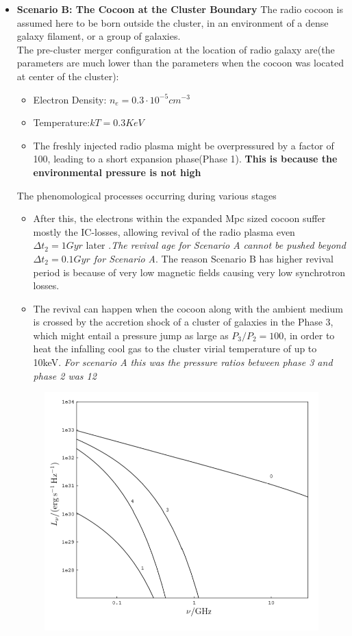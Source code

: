 \documentclass[11pt]{report}
\newcommand{\tbf}[1]{\textbf{#1}}
\newcommand{\tit}[1]{\textit{#1}}
\newcommand{\cbox}{tcolorbox}
\begin{document}
\begin{itemize}
\begin{itemize}
\begin{\cbox}
\end{\cbox}
\end{itemize}
\item \tbf{Scenario B: The Cocoon at the Cluster Boundary}
The radio cocoon is assumed here to be born outside the cluster, in an environment of a dense galaxy filament, or a group of galaxies.\\
The pre-cluster merger configuration at the location of radio galaxy are(the parameters are much lower than the parameters when the cocoon was located at center of the cluster):
\begin{itemize}
\item Electron Density: $n_e=0.3 \cdot 10^{-5}cm^{-3}$
\item Temperature:$kT=0.3KeV$
\item The freshly injected radio plasma might be overpressured by a factor of 100, leading to a short expansion phase(Phase 1). \tbf{This is because the environmental pressure is not high}
\end{itemize} 
The phenomological processes occurring during various stages
\begin{itemize}
\item After this, the electrons within the expanded Mpc sized cocoon suffer mostly the IC-losses, allowing revival of the radio plasma even $\Delta t_2 = 1Gyr$ later .\tit{The revival age for Scenario A cannot be pushed beyond $\Delta t_2=0.1 Gyr$ for Scenario A}. The reason Scenario B has higher revival period is because of very low magnetic fields causing very low synchrotron losses.
\item  The revival can happen when the cocoon along with the ambient medium is crossed by the accretion shock of a cluster of galaxies in the Phase 3, which might entail a pressure jump as large as $P_3/P_2 = 100$, in order to heat the infalling cool gas to the cluster virial temperature of up to 10keV. \tit{For scenario A this was the pressure ratios between phase 3 and phase 2 was 12}
\end{itemize} 
\begin{figure}[h!]\label{figsceB}
\includegraphics[scale=0.75]{figsceB.png}

\end{figure}
\end{itemize}
\end{document}
